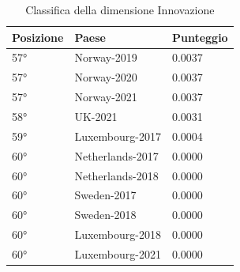 \documentclass[a4paper,12pt, openright]{report}
\begin{document}
\begin{table}[h!]
    \centering
    \begin{tabular}{ |l|l|l|  }
        \hline
        \textbf{Posizione} & \textbf{Paese} & \textbf{Punteggio} \\
        \hline
        57° & Norway-2019 & 0.0037 \\
        \hline
        57° & Norway-2020 & 0.0037 \\
        \hline
        57° & Norway-2021 & 0.0037 \\
        \hline
        58° & UK-2021  & 0.0031 \\
        \hline
        59° & Luxembourg-2017 & 0.0004 \\
        \hline
        60° & Netherlands-2017 & 0.0000 \\
        \hline
        60° & Netherlands-2018 & 0.0000 \\
        \hline
        60° & Sweden-2017 & 0.0000 \\
        \hline
        60° & Sweden-2018  & 0.0000 \\
        \hline
        60° & Luxembourg-2018 & 0.0000 \\
        \hline
        60° & Luxembourg-2021  & 0.0000 \\
        \hline
    \end{tabular}
    \caption{Classifica della dimensione Innovazione}
    \label{table:1}
\end{table}
\end{document}
